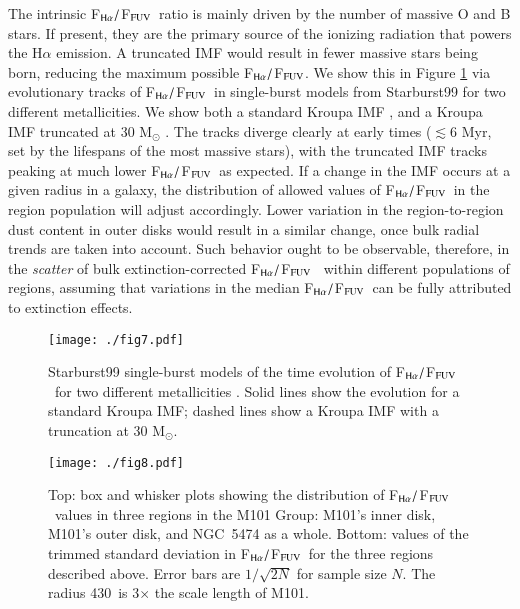 \documentclass[iop]{emulateapj}
\newcommand{\hafuv}{F$_{\rm H\alpha}/$F$_{\rm FUV}$}
\begin{document}
The intrinsic \hafuv \ ratio is mainly driven by the number of massive
O and B stars.  If present, they are the primary source of the
ionizing radiation that powers the H$\alpha$ emission.  A truncated
IMF would result in fewer massive stars being born, reducing the
maximum possible \hafuv.  We show this in Figure \ref{fig:sb99} via
evolutionary tracks of \hafuv \ in single-burst models from
Starburst99 \citep{leitherer99} for two different metallicities.  We
show both a standard Kroupa IMF \citep[solid lines;][]{kroupa01}, and
a Kroupa IMF truncated at 30 M$_{\odot}$ \citep[truncations as low as
  20 M$_{\odot}$ have been suggested, e.g.,][]{bruzzese15}.  The
tracks diverge clearly at early times ($\lesssim$6 Myr, set by the
lifespans of the most massive stars), with the truncated IMF tracks
peaking at much lower \hafuv \ as expected.  If a change in the IMF
occurs at a given radius in a galaxy, the distribution of allowed
values of \hafuv \ in the  region population will adjust
accordingly.  Lower variation in the region-to-region dust content in
outer disks would result in a similar change, once bulk radial trends
are taken into account.  Such behavior ought to be observable,
therefore, in the \emph{scatter} of bulk extinction-corrected \hafuv
\ within different populations of  regions, assuming that
variations in the median \hafuv \ can be fully attributed to
extinction effects.

\begin{figure}
  \centering
  \texttt{[image: ./fig7.pdf]}
  \caption[Evolution of \hafuv \ in Starburst99]{Starburst99
      single-burst models of the time evolution of \hafuv\ for two
    different metallicities \citep[using Padova
      isochrones;][]{bressan12}.  Solid lines show the evolution for a
    standard Kroupa IMF; dashed lines show a Kroupa IMF with a
    truncation at 30 M$_{\odot}$.
    \label{fig:sb99}}
\end{figure}

\begin{figure}
  \centering
  \texttt{[image: ./fig8.pdf]}
  \caption[Statistical comparisons of \hafuv \ across the M101 Group]{Top:
    box and whisker plots showing the distribution of \hafuv \ values
    in three regions in the M101 Group: M101's inner disk, M101's
    outer disk, and NGC~5474 as a whole.  Bottom: values of the
    trimmed standard deviation in \hafuv \ for the three regions
    described above.  Error bars are $1/\sqrt{2N}$ for sample size
    $N$.  The radius 430\arcsec \ is 3$\times$ the scale length of
    M101.
    \label{fig:boxplots}}
\end{figure}
\end{document}
